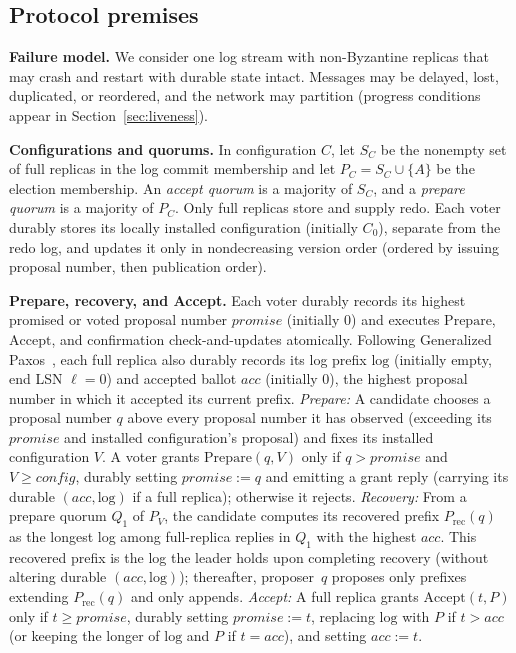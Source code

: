 \documentclass[sigconf,nonacm]{acmart}
\newcommand{\acc}{\mathit{acc}}
\begin{document}
\subsection*{Protocol premises}
\begingroup
\setlength{\parindent}{0pt}
\setlength{\parskip}{0.25\baselineskip}
\textbf{Failure model.} We consider one log stream with non-Byzantine
replicas that may crash and restart with durable state intact. Messages
may be delayed, lost, duplicated, or reordered, and the network may
partition (progress conditions appear in Section~\ref{sec:liveness}).

\textbf{Configurations and quorums.} In configuration \(C\), let \(S_C\)
be the nonempty set of full replicas in the log commit membership and let
\(P_C=S_C\cup\{A\}\) be the election membership. An \emph{accept quorum}
is a majority of \(S_C\), and a \emph{prepare quorum} is a majority of
\(P_C\). Only full replicas store and supply redo. Each voter durably
stores its locally installed configuration (initially \(C_0\)), separate
from the redo log, and updates it only in nondecreasing version order
(ordered by issuing proposal number, then publication order).

\textbf{Prepare, recovery, and Accept.} Each voter durably records its
highest promised or voted proposal number \(\mathit{promise}\)
(initially \(0\)) and executes \(\mathrm{Prepare}\), \(\mathrm{Accept}\),
and confirmation check-and-updates atomically. Following Generalized
Paxos~\cite[\S5.3]{lamport}, each full replica also durably records its
log prefix \(\mathrm{log}\) (initially empty, end LSN \(\ell=0\)) and
accepted ballot \(\acc\) (initially \(0\)), the highest proposal number
in which it accepted its current prefix.
\emph{Prepare:} A candidate chooses a proposal number \(q\) above every
proposal number it has observed (exceeding its \(\mathit{promise}\) and
installed configuration's proposal) and fixes its installed
configuration \(V\). A voter grants \(\mathrm{Prepare}(q,V)\) only if
\(q>\mathit{promise}\) and \(V\ge\mathit{config}\), durably setting
\(\mathit{promise}:=q\) and emitting a grant reply (carrying its durable
\((\acc,\mathrm{log})\) if a full replica); otherwise it rejects.
\emph{Recovery:} From a prepare quorum \(Q_1\) of \(P_V\), the candidate
computes its recovered prefix \(P_{\mathrm{rec}}(q)\) as the longest log
among full-replica replies in \(Q_1\) with the highest \(\acc\). This
recovered prefix is the log the leader holds upon completing recovery
(without altering durable \((\acc,\mathrm{log})\)); thereafter,
proposer~\(q\) proposes only prefixes extending \(P_{\mathrm{rec}}(q)\)
and only appends.
\emph{Accept:} A full replica grants \(\mathrm{Accept}(t,P)\) only if
\(t\ge\mathit{promise}\), durably setting \(\mathit{promise}:=t\),
replacing \(\mathrm{log}\) with \(P\) if \(t>\acc\) (or keeping the
longer of \(\mathrm{log}\) and \(P\) if \(t=\acc\)), and setting
\(\acc:=t\).
\end{document}
